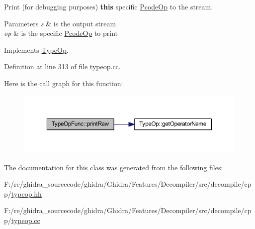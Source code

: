 Print (for debugging purposes) {\bfseries{this}} specific \mbox{\hyperlink{class_pcode_op}{Pcode\+Op}} to the stream. 


\begin{DoxyParams}{Parameters}
{\em s} & is the output stream \\
\hline
{\em op} & is the specific \mbox{\hyperlink{class_pcode_op}{Pcode\+Op}} to print \\
\hline
\end{DoxyParams}


Implements \mbox{\hyperlink{class_type_op_a60717e486917a30cc7cb6e3ce02585e1}{Type\+Op}}.



Definition at line 313 of file typeop.\+cc.

Here is the call graph for this function\+:
\nopagebreak
\begin{figure}[H]
\begin{center}
\leavevmode
\includegraphics[width=350pt]{class_type_op_func_a8cf3e73be10b60b04b275168d574e58b_cgraph}
\end{center}
\end{figure}


The documentation for this class was generated from the following files\+:\begin{DoxyCompactItemize}
\item 
F\+:/re/ghidra\+\_\+sourcecode/ghidra/\+Ghidra/\+Features/\+Decompiler/src/decompile/cpp/\mbox{\hyperlink{typeop_8hh}{typeop.\+hh}}\item 
F\+:/re/ghidra\+\_\+sourcecode/ghidra/\+Ghidra/\+Features/\+Decompiler/src/decompile/cpp/\mbox{\hyperlink{typeop_8cc}{typeop.\+cc}}\end{DoxyCompactItemize}
